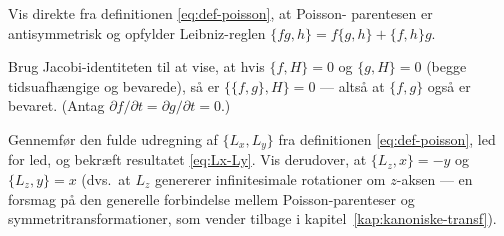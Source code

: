 \begin{opgave}
Vis direkte fra definitionen \eqref{eq:def-poisson}, at Poisson-
parentesen er antisymmetrisk og opfylder Leibniz-reglen
$\{fg,h\}=f\{g,h\}+\{f,h\}g$.
\end{opgave}

\begin{opgave}
Brug Jacobi-identiteten til at vise, at hvis $\{f,H\}=0$ og
$\{g,H\}=0$ (begge tidsuafhængige og bevarede), så er
$\{\{f,g\},H\}=0$ — altså at $\{f,g\}$ også er bevaret. (Antag
$\partial f/\partial t=\partial g/\partial t=0$.)
\end{opgave}

\begin{opgave}
Gennemfør den fulde udregning af $\{L_x,L_y\}$ fra definitionen
\eqref{eq:def-poisson}, led for led, og bekræft resultatet
\eqref{eq:Lx-Ly}. Vis derudover, at $\{L_z,x\}=-y$ og $\{L_z,y\}=x$
(dvs.\ at $L_z$ genererer infinitesimale rotationer om $z$-aksen —
en forsmag på den generelle forbindelse mellem Poisson-parenteser og
symmetritransformationer, som vender tilbage i
kapitel~\ref{kap:kanoniske-transf}).
\end{opgave}
